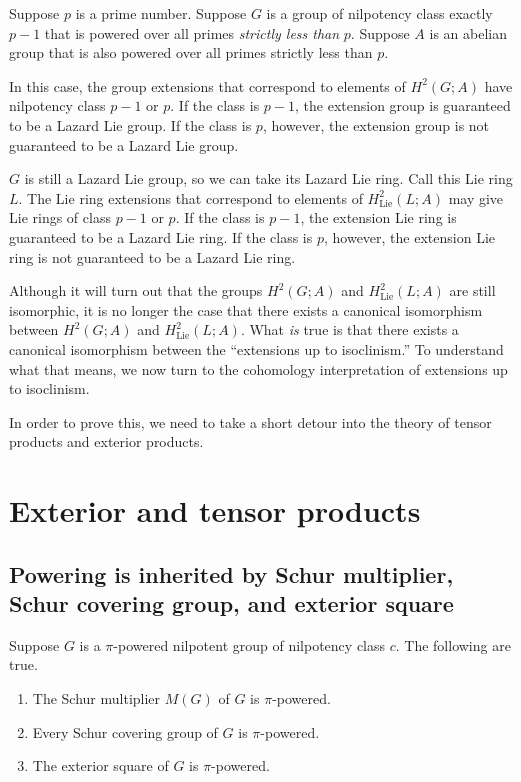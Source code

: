 Suppose $p$ is a prime number. Suppose $G$ is a group of nilpotency
class exactly $p - 1$ that is powered over all primes {\em strictly
  less than} $p$. Suppose $A$ is an abelian group that is also powered
over all primes strictly less than $p$.

In this case, the group extensions that correspond to elements of
$H^2(G;A)$ have nilpotency class $p - 1$ or $p$. If the class is $p -
1$, the extension group is guaranteed to be a Lazard Lie group. If the
class is $p$, however, the extension group is not guaranteed to be a Lazard Lie
group.

$G$ is still a Lazard Lie group, so we can take its Lazard Lie
ring. Call this Lie ring $L$. The Lie ring extensions that correspond
to elements of $H^2_{\text{Lie}}(L;A)$ may give Lie rings of class $p
- 1$ or $p$. If the class is $p - 1$, the extension Lie ring is
guaranteed to be a Lazard Lie ring. If the class is $p$, however, the
extension Lie ring is not guaranteed to be a Lazard Lie ring.

Although it will turn out that the groups $H^2(G;A)$ and
$H^2_{\text{Lie}}(L;A)$ are still isomorphic, it is no longer the case
that there exists a canonical isomorphism between $H^2(G;A)$ and
$H^2_{\text{Lie}}(L;A)$. What {\em is} true is that there exists a
canonical isomorphism between the ``extensions up to isoclinism.'' To
understand what that means, we now turn to the cohomology
interpretation of extensions up to isoclinism.

In order to prove this, we need to take a short detour into the theory
of tensor products and exterior products.

\newpage

\section{Exterior and tensor products}

\subsection{Powering is inherited by Schur multiplier, Schur covering group, and exterior square}

\begin{lemma}\label{schurcoverpipower}
  Suppose $G$ is a $\pi$-powered nilpotent group of nilpotency class
  $c$. The following are true.

  \begin{enumerate}
  \item The Schur multiplier $M(G)$ of $G$ is $\pi$-powered.
  \item Every Schur covering group of $G$ is $\pi$-powered.
  \item The exterior square of $G$ is $\pi$-powered.
  \end{enumerate}
\end{lemma}

